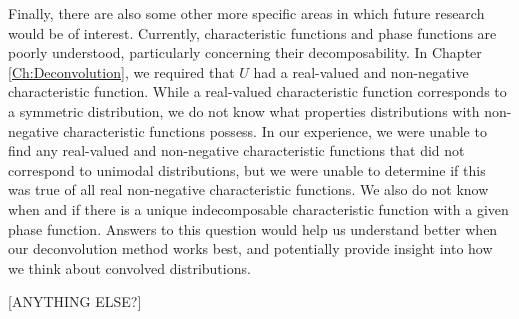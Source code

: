 Finally, there are also some other more specific areas in which future research would be of interest. Currently, characteristic functions and phase functions are poorly understood, particularly concerning their decomposability. In Chapter \ref{Ch:Deconvolution}, we required that $U$ had a real-valued and non-negative characteristic function. While a real-valued characteristic function corresponds to a symmetric distribution, we do not know what properties distributions with non-negative characteristic functions possess. In our experience, we were unable to find any real-valued and non-negative characteristic functions that did not correspond to unimodal distributions, but we were unable to determine if this was true of all real non-negative characteristic functions. We also do not know when and if there is a unique indecomposable characteristic function with a given phase function. Answers to this question would help us understand better when our deconvolution method works best, and potentially provide insight into how we think about convolved distributions.


[ANYTHING ELSE?]